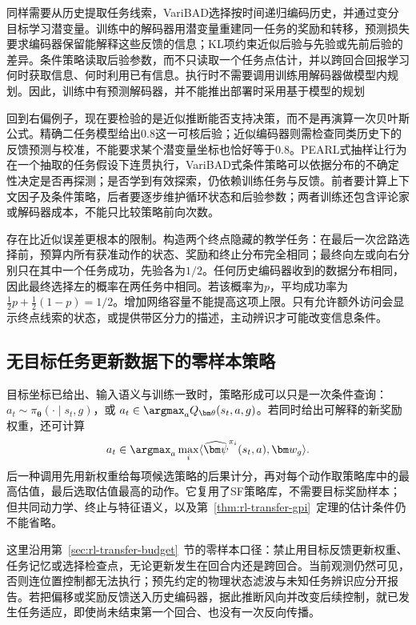 同样需要从历史提取任务线索，VariBAD选择按时间递归编码历史，并通过变分目标学习潜变量。训练中的解码器用潜变量重建同一任务的奖励和转移，预测损失要求编码器保留能解释这些反馈的信息；KL项约束近似后验与先验或先前后验的差异。条件策略读取后验参数，而不只读取一个任务点估计，并以跨回合回报学习何时获取信息、何时利用已有信息。执行时不需要调用训练用解码器做模型内规划。因此，训练中有预测解码器，并不能推出部署时采用基于模型的规划

回到右偏例子，现在要检验的是近似推断能否支持决策，而不是再演算一次贝叶斯公式。精确二任务模型给出$0.8$这一可核后验；近似编码器则需检查同类历史下的反馈预测与校准，不能要求某个潜变量坐标也恰好等于$0.8$。PEARL式抽样让行为在一个抽取的任务假设下连贯执行，VariBAD式条件策略可以依据分布的不确定性决定是否再探测；是否学到有效探索，仍依赖训练任务与反馈。前者要计算上下文因子及条件策略，后者要逐步维护循环状态和后验参数；两者训练还包含评论家或解码器成本，不能只比较策略前向次数。

存在比近似误差更根本的限制。构造两个终点隐藏的教学任务：在最后一次岔路选择前，预算内所有获准动作的状态、奖励和终止分布完全相同；最终向左或向右分别只在其中一个任务成功，先验各为$1/2$。任何历史编码器收到的数据分布相同，因此最终选择左的概率在两任务中相同。若该概率为$p$，平均成功率为$\tfrac12p+\tfrac12(1-p)=1/2$。增加网络容量不能提高这项上限。只有允许额外访问会显示终点线索的状态，或提供带区分力的描述，主动辨识才可能改变信息条件。

\subsection{无目标任务更新数据下的零样本策略}
\label{sec:rl-transfer-zero-shot}

目标坐标已给出、输入语义与训练一致时，策略形成可以只是一次条件查询：
$a_t\sim\pi_{\bm\theta}(\cdot\mid s_t,g)$，或
$a_t\in\argmax_a Q_{\bm\theta}(s_t,a,g)$。若同时给出可解释的新奖励权重，还可计算
\[
 a_t\in\argmax_a\max_i
 \langle\widehat{\bm\psi}^{\pi_i}(s_t,a),\bm w_g\rangle.
\]
后一种调用先用新权重给每项候选策略的后果计分，再对每个动作取策略库中的最高估值，最后选取估值最高的动作。它复用了SF策略库，不需要目标奖励样本；但共同动力学、终止与特征语义，以及第~\ref{thm:rl-transfer-gpi}~定理的估计条件仍不能省略。

这里沿用第~\ref{sec:rl-transfer-budget}~节的零样本口径：禁止用目标反馈更新权重、任务记忆或选择检查点，无论更新发生在回合内还是跨回合。当前观测仍然可见，否则连位置控制都无法执行；预先约定的物理状态滤波与未知任务辨识应分开报告。若把偏移或奖励反馈送入历史编码器，据此推断风向并改变后续控制，就已发生任务适应，即使尚未结束第一个回合、也没有一次反向传播。

